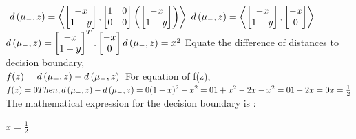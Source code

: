 \documentclass[a4paper,11pt]{article}
\begin{document}
\begin{mlsolution}
\begin{math}
\end{math}
\newline
\begin{math}
d\left ( \mu_{-}, \space z \right ) = \left \langle \begin{bmatrix} -x\\ 1-y \end{bmatrix} , \begin{bmatrix} 
1 & 0 \\ 0 & 0 \end{bmatrix} \left (  \begin{bmatrix} -x\\1 -y \end{bmatrix}  \right ) \right \rangle
\end{math}
\newline
\begin{math}
d\left ( \mu_{-}, \space z \right ) = \left \langle \begin{bmatrix} -x\\ 1-y \end{bmatrix} , \begin{bmatrix} -x \\ 0 \end{bmatrix} \right \rangle
\end{math}
\newline
\begin{math}
\\
d\left ( \mu_{-}, \space z \right ) = \begin{bmatrix} -x\\ 1-y \end{bmatrix} ^{T}.\begin{bmatrix} -x \\ 0 \end{bmatrix}\\ \\
d\left ( \mu_{-}, \space z \right ) = x^{2} \\
\end{math}
Equate the difference of distances to decision boundary,\\
\begin{math}
f(z) = d\left ( \mu_{+}, \space z \right ) - d\left ( \mu_{-}, \space z \right )\\
\end{math}
For equation of f(z),
\begin{math}
f(z) = 0 \\
Then, d\left ( \mu_{+}, \space z \right ) - d\left ( \mu_{-}, \space z \right ) = 0\\
(1-x)^{2} - x^{2} = 0\\
1 + x^{2} - 2x - x^{2} = 0\\
1 - 2x = 0\\
x = \frac{1}{2} \\
\end{math}\\
The mathematical expression for the decision boundary is :\\
\begin{center} \begin{math} x = \frac{1}{2} \end{math} \end{center}


\end{mlsolution}
\end{document}
